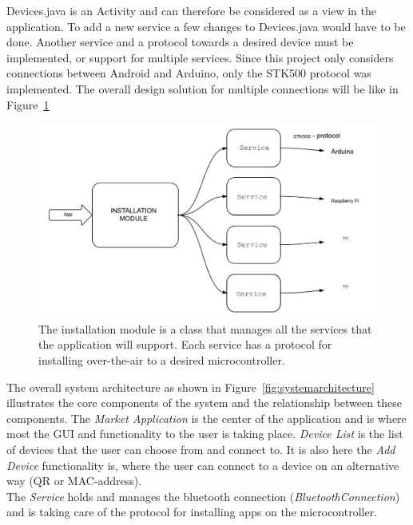 	Devices.java is an Activity and can therefore be considered as a view in the application. To add a new service a few changes to Devices.java would have to be done. Another service and a protocol towards a desired device must be implemented, or support for multiple services. Since this project only considers connections between Android and Arduino, only the STK500 protocol was implemented.
	The overall design solution for multiple connections will be like in Figure~\ref{fig:otaarchitecture}\\
	\begin{figure}[H]
	\includegraphics[scale=0.7]{figures/OTAArchitecture.pdf}
	\caption[Over The Air Architecture]{The installation module is a class that manages all the services that the application will support. Each service has a protocol for installing over-the-air to a desired microcontroller.}
	\label{fig:otaarchitecture}
	\end{figure}

	The overall system architecture as shown in Figure~\ref{fig:systemarchitecture} illustrates the core components of the system and the relationship between these components. The \textit{Market Application} is the center of the application and is where most the GUI and functionality to the user is taking place. \textit{Device List} is the list of devices that the user can choose from and connect to. It is also here the \textit{Add Device} functionality is, where the user can connect to a device on an alternative way (QR or MAC-address).\\

	The \textit{Service} holds and manages the bluetooth connection (\textit{BluetoothConnection}) and is taking care of the protocol for installing apps on the microcontroller. \\

